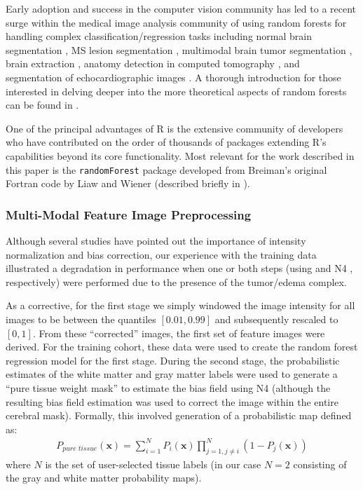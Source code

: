 \documentclass[final,5p,times,twocolumn]{elsarticle}
\begin{document}
Early adoption \cite{viola2005} and success in the
computer vision community
has led to a recent surge within the medical image analysis
community of using random forests for handling complex 
classification/regression tasks including
normal brain segmentation \cite{yi2009},
MS lesion segmentation \cite{geremia2011}, 
multimodal brain tumor segmentation
\cite{zikic2012,geremia2012}, brain extraction \cite{iglesias2010}, 
anatomy detection in computed tomography \cite{criminisi2013}, and
segmentation of echocardiographic images \cite{verhoek2011}.
A thorough introduction for those interested in delving deeper 
into the more theoretical aspects of random forests can be found
in \cite{criminisi2011}.

One of the principal advantages of R is the extensive community of
developers  who have contributed on the order of thousands of packages 
extending R's capabilities beyond its core functionality.
Most relevant for the work described in this paper
is the \verb#randomForest# package developed from Breiman's original
Fortran code by Liaw and Wiener (described briefly in \cite{liaw2002}).


\subsubsection{Multi-Modal Feature Image Preprocessing}

Although several studies have pointed out the importance of
intensity normalization and bias correction, our experience 
with the training data illustrated a degradation in performance
when one or both steps (using \cite{nyul2000} and N4 \cite{tustison2010},
respectively) were performed due to the presence of the tumor/edema complex. 
 
As a corrective, for the first stage we simply windowed the image intensity
for all images to be between the quantiles $[0.01,0.99]$ and
subsequently rescaled to $[0,1]$.  From these ``corrected'' images,
the first set of feature images were derived.  For the training cohort, these
data were used to create the random forest regression model for the first
stage.  During the second stage, the probabilistic estimates
of the white matter and gray matter labels were used to generate a
``pure tissue weight mask'' to estimate the bias field 
using N4 (although the resulting bias field estimation was used
to correct the image within the entire cerebral mask).  Formally, this 
involved generation of a probabilistic map defined as:
\begin{align}
  P_{pure\,\,tissue}(\mathbf{x}) = \sum_{i=1}^N P_i(\mathbf{x}) \prod_{j=1, j \neq i}^N \left( 1 - P_j(\mathbf{x}) \right)
\end{align}
where $N$ is the set of user-selected tissue labels (in our
case $N=2$ consisting of the gray and white matter probability
maps).
\end{document}

